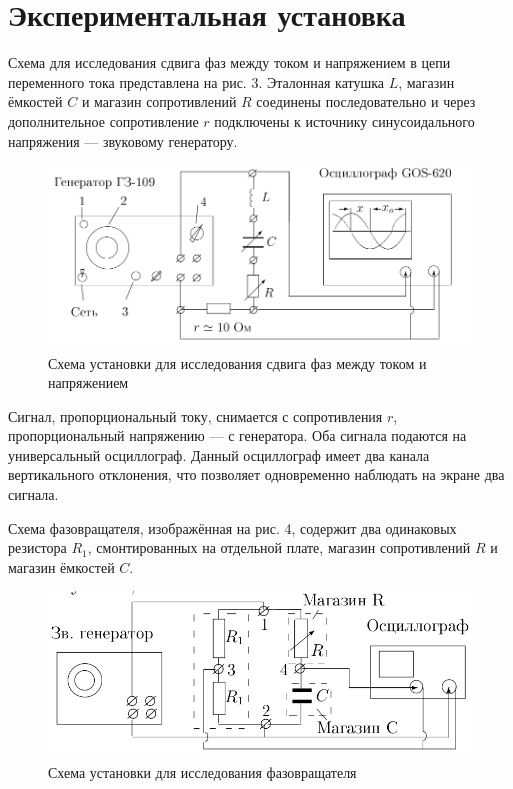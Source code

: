 \documentclass[12pt]{article}
\begin{document}
\section*{Экспериментальная установка}
\par
	Схема для исследования сдвига фаз между током и напряжением в цепи переменного тока представлена на рис. 3. Эталонная катушка $L$, магазин ёмкостей $C$ и магазин сопротивлений $R$ соединены последовательно и через дополнительное сопротивление $r$ подключены к источнику синусоидального напряжения --- звуковому генератору.
\clearpage	 
\begin{figure}[h!]
	\centering
	\includegraphics[width=15cm]{image3.png}
	\caption{Схема установки для исследования сдвига фаз между током и напряжением}
	\label{image3}
\end{figure}	
\par
	Сигнал, пропорциональный току, снимается с сопротивления $r$, пропорциональный напряжению --- с генератора. Оба сигнала подаются на универсальный осциллограф. Данный осциллограф имеет два канала вертикального отклонения, что позволяет одновременно наблюдать на экране два сигнала.
\par 	
	Схема фазовращателя, изображённая на рис. 4, содержит два одинаковых резистора $R_1$, смонтированных на отдельной плате, магазин сопротивлений $R$ и магазин ёмкостей $C$.
\begin{figure}[h!]
	\centering
	\includegraphics[width=15cm]{image4.png}
	\caption{Схема установки для исследования фазовращателя}
	\label{image4}
\end{figure}
\end{document}
